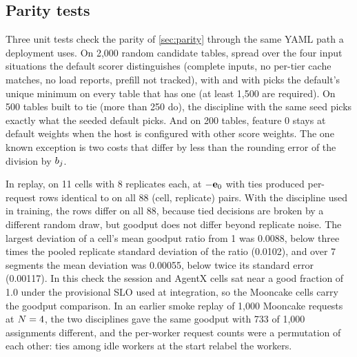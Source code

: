 \subsection{Parity tests}

Three unit tests check the parity of \cref{sec:parity} through the same YAML path a deployment
uses. On 2,000 random candidate tables, spread over the four input situations the default scorer
distinguishes (complete inputs, no per-tier cache matches, no load reports, prefill not tracked),
\lc{} with  and with  picks the default's unique minimum on every table that has
one (at least 1,500 are required). On 500 tables built to tie (more than 250 do), the
 discipline with the same seed picks exactly what the seeded default picks. And on
200 tables, feature 0 stays at default weights when the host is configured with other score
weights. The one known exception is two costs that differ by less than the rounding error of the
division by $b_j$.

In replay, on 11 cells with 8 replicates each, \lc{} at $-\mathbf{e}_{0}$ with  ties
produced per-request rows identical to  on all 88 (cell, replicate) pairs. With the
 discipline used in training, the rows differ on all 88, because tied decisions
are broken by a different random draw, but goodput does not differ beyond replicate noise. The
largest deviation of a cell's mean goodput ratio from 1 was 0.0088, below three times the pooled
replicate standard deviation of the ratio (0.0102), and over 7 segments the mean deviation was
0.00055, below twice its standard error (0.00117).
In this check the session and AgentX cells sat near a good fraction of 1.0 under the provisional
SLO used at integration, so the Mooncake cells carry the goodput comparison.
In an earlier smoke replay of 1,000 Mooncake requests at $N = 4$, the two disciplines gave the
same goodput with 733 of 1,000 assignments different, and the per-worker request counts were a
permutation of each other: ties among idle workers at the start relabel the workers.

